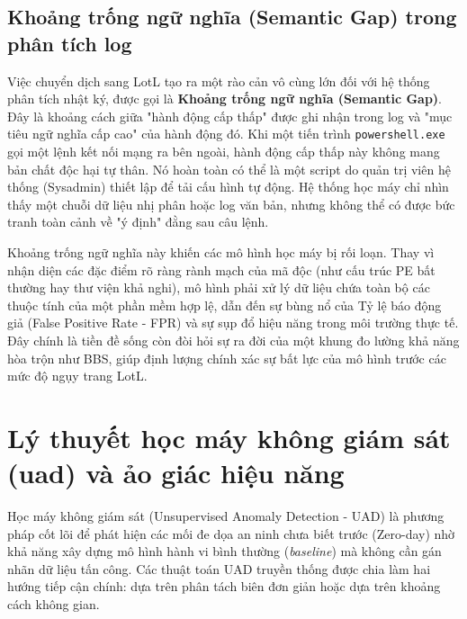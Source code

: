 ﻿\documentclass[../main.tex]{subfiles}
\begin{document}
\subsection{Khoảng trống ngữ nghĩa (Semantic Gap) trong phân tích log}
Việc chuyển dịch sang LotL tạo ra một rào cản vô cùng lớn đối với hệ thống phân tích nhật ký, được gọi là \textbf{Khoảng trống ngữ nghĩa (Semantic Gap)}. Đây là khoảng cách giữa "hành động cấp thấp" được ghi nhận trong log và "mục tiêu ngữ nghĩa cấp cao" của hành động đó.
Khi một tiến trình \texttt{powershell.exe} gọi một lệnh kết nối mạng ra bên ngoài, hành động cấp thấp này không mang bản chất độc hại tự thân. Nó hoàn toàn có thể là một script do quản trị viên hệ thống (Sysadmin) thiết lập để tải cấu hình tự động. Hệ thống học máy chỉ nhìn thấy một chuỗi dữ liệu nhị phân hoặc log văn bản, nhưng không thể có được bức tranh toàn cảnh về "ý định" đằng sau câu lệnh.

Khoảng trống ngữ nghĩa này khiến các mô hình học máy bị rối loạn. Thay vì nhận diện các đặc điểm rõ ràng rành mạch của mã độc (như cấu trúc PE bất thường hay thư viện khả nghi), mô hình phải xử lý dữ liệu chứa toàn bộ các thuộc tính của một phần mềm hợp lệ, dẫn đến sự bùng nổ của Tỷ lệ báo động giả (False Positive Rate - FPR) và sự sụp đổ hiệu năng trong môi trường thực tế. Đây chính là tiền đề sống còn đòi hỏi sự ra đời của một khung đo lường khả năng hòa trộn như BBS, giúp định lượng chính xác sự bất lực của mô hình trước các mức độ ngụy trang LotL.

\section{Lý thuyết học máy không giám sát (uad) và ảo giác hiệu năng}
\label{section:1.5}

Học máy không giám sát (Unsupervised Anomaly Detection - UAD) là phương pháp cốt lõi để phát hiện các mối đe dọa an ninh chưa biết trước (Zero-day) nhờ khả năng xây dựng mô hình hành vi bình thường (\textit{baseline}) mà không cần gán nhãn dữ liệu tấn công. Các thuật toán UAD truyền thống được chia làm hai hướng tiếp cận chính: dựa trên phân tách biên đơn giản hoặc dựa trên khoảng cách không gian.
\end{document}
